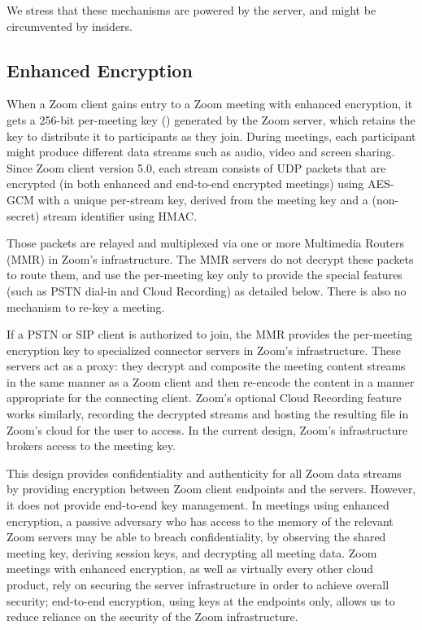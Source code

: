 We stress that these mechanisms are powered by the server, and might be circumvented by insiders.

\subsection{Enhanced Encryption}

When a Zoom client gains entry to a Zoom meeting with enhanced encryption, it gets a 256-bit
per-meeting key (\MK) generated by the Zoom server, which retains the key to distribute it to
participants as they join. During meetings, each participant might produce different data streams
such as audio, video and screen sharing. Since Zoom client version 5.0, each stream consists of UDP
packets that are encrypted (in both enhanced and end-to-end encrypted meetings) using AES-GCM with a
unique per-stream key, derived from the meeting key and a (non-secret) stream identifier using HMAC.

Those packets are relayed and multiplexed via one or more Multimedia Routers (MMR) in Zoom's
infrastructure. The MMR servers do not decrypt these packets to route them, and use the per-meeting
key only to provide the special features (such as PSTN dial-in and Cloud Recording) as detailed
below. There is also no mechanism to re-key a meeting.

If a PSTN or SIP client is authorized to join, the MMR provides the per-meeting encryption key to
specialized connector servers in Zoom's infrastructure. These servers act as a proxy: they decrypt
and composite the meeting content streams in the same manner as a Zoom client and then re-encode the
content in a manner appropriate for the connecting client. Zoom's optional Cloud Recording feature
works similarly, recording the decrypted streams and hosting the resulting file in Zoom's cloud for
the user to access. In the current design, Zoom's infrastructure brokers access to the meeting key.

This design provides confidentiality and authenticity for all Zoom data streams by providing
encryption between Zoom client endpoints and the servers. However, it does not provide end-to-end
key management. In meetings using enhanced encryption, a passive adversary who has access to the
memory of the relevant Zoom servers may be able to breach confidentiality, by observing the shared
meeting key, deriving session keys, and decrypting all meeting data. Zoom meetings with enhanced
encryption, as well as virtually every other cloud product, rely on securing the server
infrastructure in order to achieve overall security; end-to-end encryption, using keys at the
endpoints only, allows us to reduce reliance on the security of the Zoom infrastructure.

